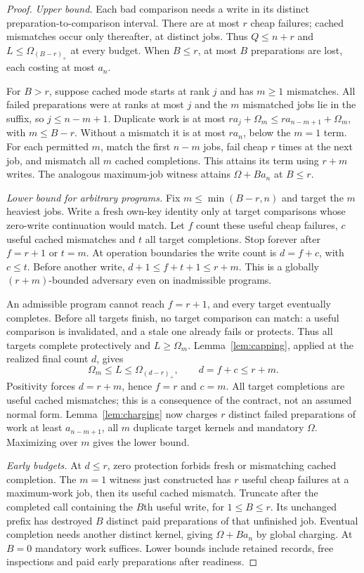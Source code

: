 \documentclass[acmsmall,screen,review,anonymous]{acmart}
\begin{document}
\begin{proof}
\emph{Upper bound.} Each bad comparison needs a write in its distinct preparation-to-comparison interval. There are at most $r$ cheap failures; cached mismatches occur only thereafter, at distinct jobs. Thus $Q\le n+r$ and $L\le\Omega_{(B-r)_+}$ at every budget. When $B\le r$, at most $B$ preparations are lost, each costing at most $a_n$.

For $B>r$, suppose cached mode starts at rank $j$ and has $m\ge1$ mismatches. All failed preparations were at ranks at most $j$ and the $m$ mismatched jobs lie in the suffix, so $j\le n-m+1$. Duplicate work is at most $r a_j+\Omega_m\le r a_{n-m+1}+\Omega_m$, with $m\le B-r$. Without a mismatch it is at most $r a_n$, below the $m=1$ term. For each permitted $m$, match the first $n-m$ jobs, fail cheap $r$ times at the next job, and mismatch all $m$ cached completions. This attains its term using $r+m$ writes. The analogous maximum-job witness attains $\Omega+B a_n$ at $B\le r$.

\emph{Lower bound for arbitrary programs.} Fix $m\le\min(B-r,n)$ and target the $m$ heaviest jobs. Write a fresh own-key identity only at target comparisons whose zero-write continuation would match. Let $f$ count these useful cheap failures, $c$ useful cached mismatches and $t$ all target completions. Stop forever after $f=r+1$ or $t=m$. At operation boundaries the write count is $d=f+c$, with $c\le t$. Before another write, $d+1\le f+t+1\le r+m$. This is a globally $(r+m)$-bounded adversary even on inadmissible programs.

An admissible program cannot reach $f=r+1$, and every target eventually completes. Before all targets finish, no target comparison can match: a useful comparison is invalidated, and a stale one already fails or protects. Thus all targets complete protectively and $L\ge\Omega_m$. Lemma~\ref{lem:capping}, applied at the realized final count $d$, gives
\[
 \Omega_m\le L\le\Omega_{(d-r)_+},\qquad d=f+c\le r+m.
\]
Positivity forces $d=r+m$, hence $f=r$ and $c=m$. All target completions are useful cached mismatches; this is a consequence of the contract, not an assumed normal form. Lemma~\ref{lem:charging} now charges $r$ distinct failed preparations of work at least $a_{n-m+1}$, all $m$ duplicate target kernels and mandatory $\Omega$. Maximizing over $m$ gives the lower bound.

\emph{Early budgets.} At $d\le r$, zero protection forbids fresh or mismatching cached completion. The $m=1$ witness just constructed has $r$ useful cheap failures at a maximum-work job, then its useful cached mismatch. Truncate after the completed call containing the $B$th useful write, for $1\le B\le r$. Its unchanged prefix has destroyed $B$ distinct paid preparations of that unfinished job. Eventual completion needs another distinct kernel, giving $\Omega+B a_n$ by global charging. At $B=0$ mandatory work suffices. Lower bounds include retained records, free inspections and paid early preparations after readiness.
\end{proof}
\end{document}
